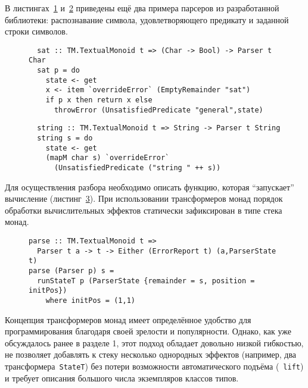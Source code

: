   В листингах~\ref{listing:mtlParserSat} и~\ref{listing:mtlParserString} приведены ещё два примера парсеров из разработанной библиотеки:
  распознавание символа, удовлетворяющего предикату и заданной строки символов.

  \begin{figure}[h]
  \begin{lstlisting}
  sat :: TM.TextualMonoid t => (Char -> Bool) -> Parser t Char
  sat p = do
    state <- get
    x <- item `overrideError` (EmptyRemainder "sat")
    if p x then return x else
      throwError (UnsatisfiedPredicate "general",state)
  \end{lstlisting}
  \caption{}
  \label{listing:mtlParserSat}
  \end{figure}

  \begin{figure}[h]
  \begin{lstlisting}
  string :: TM.TextualMonoid t => String -> Parser t String
  string s = do
    state <- get
    (mapM char s) `overrideError`
      (UnsatisfiedPredicate ("string " ++ s))
  \end{lstlisting}
  \caption{}
  \label{listing:mtlParserString}
  \end{figure}

  Для осуществления разбора необходимо описать функцию, которая ``запускает''
  вычисление (листинг~\ref{listing:mtlParseRun}). При использовании трансформеров
  монад порядок обработки вычислительных эффектов статически зафиксирован в
  типе стека монад.

  \begin{figure}[h]
  \begin{lstlisting}
parse :: TM.TextualMonoid t =>
  Parser t a -> t -> Either (ErrorReport t) (a,ParserState t)
parse (Parser p) s =
  runStateT p (ParserState {remainder = s, position = initPos})
    where initPos = (1,1)
  \end{lstlisting}
  \caption{}
  \label{listing:mtlParseRun}
  \end{figure}


  Концепция трансформеров монад имеет определённое удобство
  для программирования благодаря своей зрелости и популярности. Однако, как уже
  обсуждалось ранее в разделе 1, этот подход обладает довольно низкой гибкостью,
  не позволяет добавлять к стеку несколько однородных эффектов (например, два
  трансформера~\lstinline{StateT}) без потери возможности автоматического
  подъёма (~\lstinline{lift}) и требует описания большого числа экземпляров классов
  типов.

